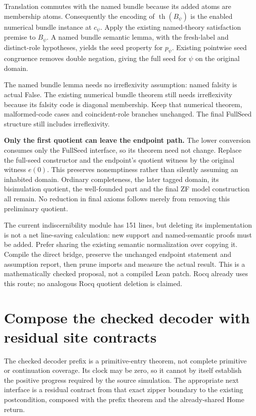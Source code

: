 \documentclass[11pt]{article}
\begin{document}
Translation commutes with the named bundle because its added atoms are membership atoms. Consequently the encoding of $\operatorname{th}(B_\psi)$ is the enabled numerical bundle instance at $c_\psi$. Apply the existing named-theory satisfaction premise to $B_\psi$. A named bundle semantic lemma, with the fresh-label and distinct-role hypotheses, yields the seed property for $p_\psi$. Existing pointwise seed congruence removes double negation, giving the full seed for $\psi$ on the original domain.

The named bundle lemma needs no irreflexivity assumption: named falsity is actual False. The existing numerical bundle theorem still needs irreflexivity because its falsity code is diagonal membership. Keep that numerical theorem, malformed-code cases and coincident-role branches unchanged. The final FullSeed structure still includes irreflexivity.

\textbf{Only the first quotient can leave the endpoint path.} The lower conversion consumes only the FullSeed interface, so its theorem need not change. Replace the full-seed constructor and the endpoint's quotient witness by the original witness $e(0)$. This preserves nonemptiness rather than silently assuming an inhabited domain. Ordinary completeness, the later tagged domain, its bisimulation quotient, the well-founded part and the final ZF model construction all remain. No reduction in final axioms follows merely from removing this preliminary quotient.

The current indiscernibility module has 151 lines, but deleting its implementation is not a net line-saving calculation: new support and named-semantic proofs must be added. Prefer sharing the existing semantic normalization over copying it. Compile the direct bridge, preserve the unchanged endpoint statement and assumption report, then prune imports and measure the actual result. This is a mathematically checked proposal, not a compiled Lean patch. Rocq already uses this route; no analogous Rocq quotient deletion is claimed.

\section{Compose the checked decoder with residual site contracts}
The checked decoder prefix is a primitive-entry theorem, not complete primitive or continuation coverage. Its clock may be zero, so it cannot by itself establish the positive progress required by the source simulation. The appropriate next interface is a residual contract from that exact zipper boundary to the existing postcondition, composed with the prefix theorem and the already-shared Home return.
\end{document}

